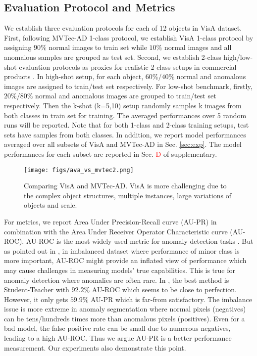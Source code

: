 \subsection{Evaluation Protocol and Metrics}
We establish three evaluation protocols for each of 12 objects in VisA dataset. First, following MVTec-AD 1-class protocol, we establish VisA 1-class protocol by assigning $90\%$ normal images to train set while $10\%$ normal images and all anomalous samples are grouped as test set. Second, we establish 2-class high/low-shot evaluation protocols as proxies for realistic 2-class setups in commercial products \cite{LfV,VIAI}. In high-shot setup, for each object, $60\%$/$40\%$ normal and anomalous images are assigned to train/test set respectively. For low-shot benchmark, firstly, $20\%$/$80\%$ normal and anomalous images are grouped to train/test set respectively. Then the k-shot (k=5,10) setup randomly samples k images from both classes in train set for training. The averaged performances over 5 random runs will be reported. Note that for both 1-class and 2-class training setups, test sets have samples from both classes. In addition, we report model performances averaged over all subsets of VisA and MVTec-AD in Sec. \ref{sec:exp}. The model performances for each subset are reported in Sec. \textcolor{red}{D} of supplementary.

\begin{figure}[!t]
 \centering
\texttt{[image: figs/ava\_vs\_mvtec2.png]}
\caption{Comparing VisA and MVTec-AD. VisA is more challenging due to the complex object structures, multiple instances, large variations of objects and scale.}
\label{fig:ava_vs_mvtec}
\end{figure}

For metrics, we report Area Under Precision-Recall curve (AU-PR) in combination with the Area Under Receiver Operator Characteristic curve (AU-ROC). AU-ROC is the most widely used metric for anomaly detection tasks \cite{defard2021padim,Roth_2022_CVPR,yi2020patch}. But as pointed out in \cite{cook2020consult,davis2006relationship,saito2015precision}, in imbalanced dataset where performance of minor class is more important, AU-ROC might provide an inflated view of performance which may cause challenges in measuring models' true capabilities. This is true for anomaly detection where anomalies are often rare. In \cite{bergmann2021mvtec}, the best method is Student-Teacher \cite{bergmann2020uninformed} with $92.2\%$ AU-ROC which seems to be close to perfection. However, it only gets $59.9\%$ AU-PR which is far-from satisfactory. The imbalance issue is more extreme in anomaly segmentation where normal pixels (negatives) can be tens/hundreds times more than anomalous pixels (positives). Even for a bad model, the false positive rate can be small due to numerous negatives, leading to a high AU-ROC. Thus we argue AU-PR is a better performance measurement. Our experiments also demonstrate this point.

